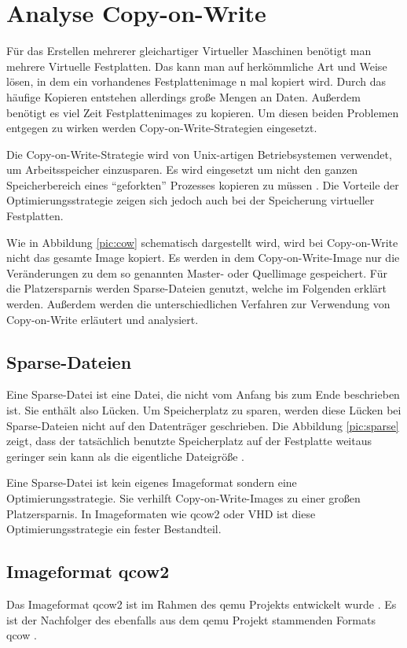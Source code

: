 \chapter{Analyse Copy-on-Write}
Für das Erstellen mehrerer gleichartiger Virtueller Maschinen benötigt man mehrere Virtuelle Festplatten. Das kann man auf herkömmliche Art und Weise lösen, in dem ein vorhandenes Festplattenimage n mal kopiert wird. Durch das häufige Kopieren entstehen allerdings große Mengen an Daten. Außerdem benötigt es viel Zeit Festplattenimages zu kopieren. Um diesen beiden Problemen entgegen zu wirken werden Copy-on-Write-Strategien eingesetzt.

Die Copy-on-Write-Strategie wird von Unix-artigen Betriebsystemen verwendet, um Arbeitsspeicher einzusparen. Es wird eingesetzt um nicht den ganzen Speicherbereich eines ``geforkten'' Prozesses kopieren zu müssen \cite{linuxcow}. Die Vorteile der Optimierungsstrategie zeigen sich jedoch auch bei der Speicherung virtueller Festplatten.

Wie in Abbildung \ref{pic:cow} schematisch dargestellt wird, wird bei Copy-on-Write nicht das gesamte Image kopiert. Es werden in dem Copy-on-Write-Image nur die Veränderungen zu dem so genannten Master- oder Quellimage gespeichert. Für die Platzersparnis werden Sparse-Dateien genutzt, welche im Folgenden erklärt werden. Außerdem werden die unterschiedlichen Verfahren zur Verwendung von Copy-on-Write erläutert und analysiert.

\section{Sparse-Dateien}
Eine Sparse-Datei ist eine Datei, die nicht vom Anfang bis zum Ende beschrieben ist. Sie enthält also Lücken. Um Speicherplatz zu sparen, werden diese Lücken bei Sparse-Dateien nicht auf den Datenträger geschrieben. Die Abbildung \ref{pic:sparse} zeigt, dass der tatsächlich benutzte Speicherplatz auf der Festplatte weitaus geringer sein kann als die eigentliche Dateigröße \cite{Sparse}.


Eine Sparse-Datei ist kein eigenes Imageformat sondern eine Optimierungsstrategie. Sie verhilft Copy-on-Write-Images zu einer großen Platzersparnis. In Imageformaten wie qcow2 oder VHD ist diese Optimierungsstrategie ein fester Bestandteil. 

\section{Imageformat qcow2}
Das Imageformat qcow2 ist im Rahmen des qemu Projekts entwickelt wurde \cite{qemuwiki}. Es ist der Nachfolger des ebenfalls aus dem qemu Projekt stammenden Formats qcow \cite{qcowmarkmc}.  

